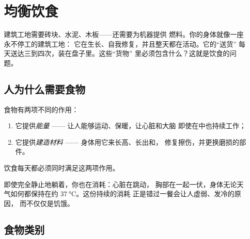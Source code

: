 \chapter{均衡饮食}\label{ch:g3:balanced-diet}

建筑工地需要砖块、水泥、木板——还需要为机器提供
燃料。你的身体就像一座永不停工的建筑工地：
它在生长、自我修复，并且整天都在活动。它的“送货”
每天送达三到四次，装在盘子里。这些“货物”
里必须包含什么？这就是饮食的问题。

\section{人为什么需要食物}

\begin{proposition}[食物的两项作用]\label{prop:g3:balanced-diet:jobs}
食物有两项不同的作用：
\begin{enumerate}
  \item 它提供\emph{能量} ——
        让人能够运动、保暖，让心脏和大脑
        即使在中也持续工作；
  \item 它提供\emph{建造材料} ——
        身体用它来长高、长出和，
        修复擦伤，并更换磨损的部件。
\end{enumerate}
饮食每天都必须同时满足这两项作用。
\end{proposition}
\admitted

\begin{example}[静止时也需要能量]\label{ex:g3:balanced-diet:rest}
即使完全静止地躺着，你也在消耗：心脏在跳动，
胸部在一起一伏，身体无论天气如何都保持在约
$\qty{37}{\degreeCelsius}$。这份持续的消耗
正是错过一餐会让人虚弱、发冷的原因，
而不仅仅是饥饿。
\end{example}

\section{食物类别}


